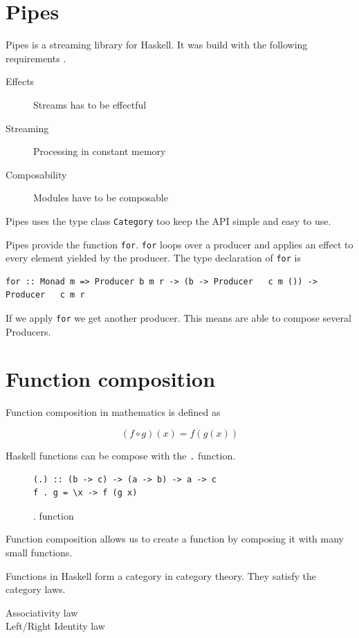 \documentclass[twoside, a4paper]{article}
\begin{document}
\section{Pipes}
\label{sec:pipes}

Pipes is a streaming library for Haskell. It was build with the following requirements \cite{gonzales13}.
\begin{description}
\item[Effects] Streams has to be effectful
\item[Streaming] Processing in constant memory
\item[Composability] Modules have to be composable
\end{description}

Pipes uses the type class \verb|Category| too keep the API simple and easy to use.

Pipes provide the function \verb|for|. \verb|for| loops over a producer and applies an effect to every element yielded by the producer.  The type declaration of \verb|for| is
\begin{program}
\begin{verbatim}
for :: Monad m => Producer b m r -> (b -> Producer   c m ()) -> Producer   c m r
\end{verbatim}
\caption{type of \verb|for|}
\end{program}

If we apply \verb|for| we get another producer. This means are able to compose several Producers.

\section{Function composition}

\label{sec:functioncomposition}

Function composition in mathematics is defined as

\begin{equation}
  \label{eq:functioncomposition}
  (f \circ g)(x) = f(g(x))
\end{equation}

Haskell functions can be compose with the \verb|.| function.

\begin{figure}
  \centering
\begin{verbatim}
(.) :: (b -> c) -> (a -> b) -> a -> c
f . g = \x -> f (g x)
\end{verbatim}
  \caption{. function}
  \label{fig:compositionfunction}
\end{figure}

Function composition allows us to create a function by composing it with many small functions. 

Functions in Haskell form a category in category theory. They satisfy the category laws.
\begin{description}
\item[Associativity law] 
\item[Left/Right Identity law] 
\end{description}



\end{document}
